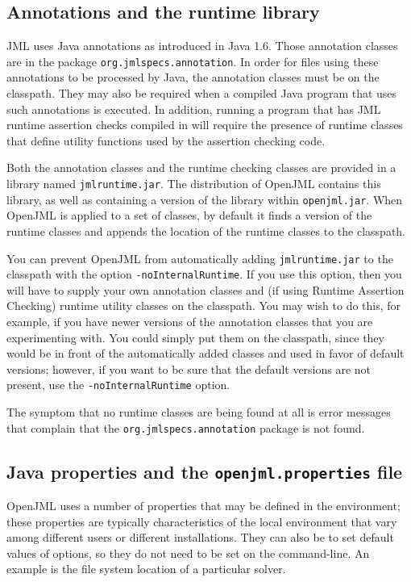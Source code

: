 \subsection{Annotations and the runtime library}

JML uses Java annotations as introduced in Java 1.6. Those annotation classes are in the package
{\tt org.jmlspecs.annotation}. In order for files using these annotations to be processed by Java,
the annotation classes must be on the classpath. They may also be required when a compiled Java program
that uses such annotations is executed. In addition, running a program that has JML runtime assertion
checks compiled in will require the presence of runtime classes that define utility functions used by the assertion checking code.

Both the annotation classes and the runtime checking classes are provided in a library named {\tt jmlruntime.jar}.  The distribution of OpenJML contains this library, as well as containing a
version of the library within {\tt openjml.jar}. When OpenJML is applied to a set of classes, by default it finds a version of the runtime classes and appends the location of the runtime classes
to the classpath.

You can prevent OpenJML from automatically adding {\tt jmlruntime.jar} to the classpath with the
option {\tt -noInternalRuntime}. If you use this option, then you will have to supply your own
annotation classes and (if using Runtime Assertion Checking) runtime utility classes on the classpath. You may wish to do this, for example, if you have newer versions of the annotation
classes that you are experimenting with. You could simply put them on the classpath, since they
would be in front of the automatically added classes and used in favor of default versions;
however, if you want to be sure that the default versions are not present, use the {\tt -noInternalRuntime} option.

The symptom that no runtime classes are being found at all is error messages that complain that
the {\tt org.jmlspecs.annotation} package is not found.


\subsection{Java properties and the {\tt openjml.properties} file}

OpenJML uses a number of properties that may be defined in the environment;
these properties are typically characteristics of the local environment that vary among different users or different installations. 
They can also be to set default values of options, so they do not need to be set on the command-line. An example is the file system location of a particular solver.

